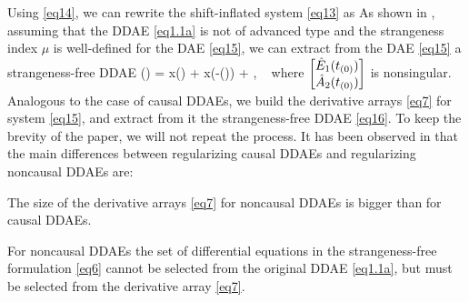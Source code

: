 \documentclass[final,reqno]{siamltex}
\renewenvironment{enumerate}[1]{\begin{compactenum}#1}{\end{compactenum}}
\begin{document}
Using \eqref{eq14}, we can rewrite the shift-inflated system \eqref{eq13} as
%
\be\label{eq15}
\ee
%
As shown in \cite{HaM14}, assuming that the DDAE \eqref{eq1.1a} is not of advanced type and the strangeness index $\mu$ is well-defined for the DAE \eqref{eq15}, we can extract from the DAE \eqref{eq15} a strangeness-free DDAE 
%
\be\label{eq16}
  () \!=\!  x() \!+\!
  x(-\tau()) \!+\! , \ 
\ee
%
where $\begin{bmatrix} \hat{E}_{1}(t_{(0)}) \\ \hat{A}_{2}(t_{(0)}) \end{bmatrix}$ is nonsingular.\\
Analogous to the case of causal DDAEs, we build the derivative arrays \eqref{eq7} for system \eqref{eq15}, and extract from it the 
strangeness-free DDAE \eqref{eq16}. To keep the brevity of the paper, we will not repeat the process.
It has been observed in \cite{HaM14} that the main differences between regularizing causal DDAEs and regularizing noncausal DDAEs are:
\begin{enumerate}
 \item[i)] The size of the derivative arrays \eqref{eq7} for noncausal DDAEs is bigger than for causal DDAEs.
 \item[ii)] For noncausal DDAEs the set of differential equations in the strangeness-free formulation \eqref{eq6} cannot be selected from the original DDAE \eqref{eq1.1a}, but must be 
 selected from the derivative array \eqref{eq7}.
\end{enumerate}
\end{document}
